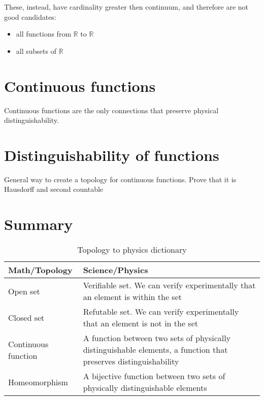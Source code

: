 \documentclass[11pt,letterpaper,fleqn]{memoir} %
\begin{document}
These, instead, have cardinality greater then continuum, and therefore are not good candidates:
\begin{itemize}
	\item all functions from $\mathbb{R}$ to $\mathbb{R}$
	\item all subsets of $\mathbb{R}$
\end{itemize}


\section{Continuous functions}

Continuous functions are the only connections that preserve physical distinguishability.

\section{Distinguishability of functions}

General way to create a topology for continuous functions. Prove that it is Hausdorff and second countable

\section{Summary}

\begin{table}[h]
	\centering
\begin{tabular}{p{} p{}}
	Math/Topology & Science/Physics \\ 
	\hline 
	Open set & Verifiable set. We can verify experimentally that an element is within the set  \\ 
	Closed set & Refutable set. We can verify experimentally that an element is not in the set \\ 
	Continuous \newline function &  A function between two sets of physically distinguishable elements, a function that preserves distinguishability \\
	Homeomorphism &  A bijective function between two sets of physically distinguishable elements \\
\end{tabular} 
	\caption{Topology to physics dictionary}
\end{table}

	
\end{document}
